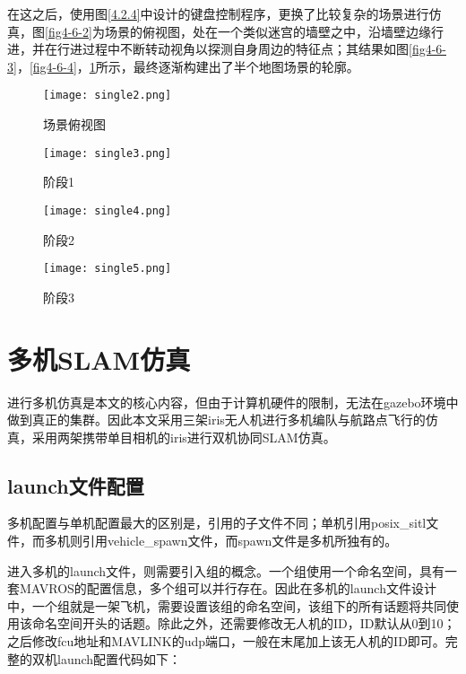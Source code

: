 在这之后，使用图\ref{4.2.4}中设计的键盘控制程序，更换了比较复杂的场景进行仿真，图\ref{fig4-6-2}为场景的俯视图，处在一个类似迷宫的墙壁之中，沿墙壁边缘行进，并在行进过程中不断转动视角以探测自身周边的特征点；其结果如图\ref{fig4-6-3}，\ref{fig4-6-4}，\ref{fig4-6-5}所示，最终逐渐构建出了半个地图场景的轮廓。

\begin{figure}[htbp]
	\centering
	\begin{minipage}[t]{0.24\columnwidth} %
		\centering
		\texttt{[image: single2.png]}
		\caption{场景俯视图}
		\label{fig4-6-2}
	\end{minipage}
	\begin{minipage}[t]{0.24\columnwidth}
		\centering
		\texttt{[image: single3.png]}
		\caption{阶段1}
		\label{fig4-6-3}
	\end{minipage}
	\begin{minipage}[t]{0.24\columnwidth}
		\centering
		\texttt{[image: single4.png]}
		\caption{阶段2}
		\label{fig4-6-4}
	\end{minipage}
	\begin{minipage}[t]{0.24\columnwidth}
		\centering
		\texttt{[image: single5.png]}
		\caption{阶段3}
		\label{fig4-6-5}
	\end{minipage}
\end{figure}


\section{多机SLAM仿真}

进行多机仿真是本文的核心内容，但由于计算机硬件的限制，无法在gazebo环境中做到真正的集群。因此本文采用三架iris无人机进行多机编队与航路点飞行的仿真，采用两架携带单目相机的iris进行双机协同SLAM仿真。

\subsection{launch文件配置} \label{4.3.1}

多机配置与单机配置最大的区别是，引用的子文件不同；单机引用posix\_sitl文件，而多机则引用vehicle\_spawn文件，而spawn文件是多机所独有的。

进入多机的launch文件，则需要引入组的概念。一个组使用一个命名空间，具有一套MAVROS的配置信息，多个组可以并行存在。因此在多机的launch文件设计中，一个组就是一架飞机，需要设置该组的命名空间，该组下的所有话题将共同使用该命名空间开头的话题。除此之外，还需要修改无人机的ID，ID默认从0到10；之后修改fcu地址和MAVLINK的udp端口，一般在末尾加上该无人机的ID即可。完整的双机launch配置代码如下：

